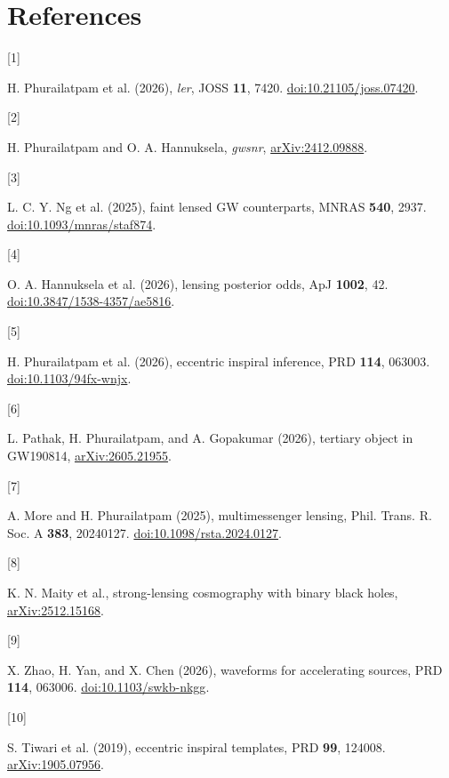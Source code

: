 \documentclass[11pt]{article}
\begin{document}
\section*{References}
\begingroup
\setlength{\parskip}{0pt}
\small
\hypertarget{ref1}{[1]} H. Phurailatpam et al. (2026), \textit{ler}, JOSS \textbf{11}, 7420. \href{https://doi.org/10.21105/joss.07420}{doi:10.21105/joss.07420}.\par
\hypertarget{ref2}{[2]} H. Phurailatpam and O. A. Hannuksela, \textit{gwsnr}, \href{https://arxiv.org/abs/2412.09888}{arXiv:2412.09888}.\par
\hypertarget{ref3}{[3]} L. C. Y. Ng et al. (2025), faint lensed GW counterparts, MNRAS \textbf{540}, 2937. \href{https://doi.org/10.1093/mnras/staf874}{doi:10.1093/mnras/staf874}.\par
\hypertarget{ref4}{[4]} O. A. Hannuksela et al. (2026), lensing posterior odds, ApJ \textbf{1002}, 42. \href{https://doi.org/10.3847/1538-4357/ae5816}{doi:10.3847/1538-4357/ae5816}.\par
\hypertarget{ref5}{[5]} H. Phurailatpam et al. (2026), eccentric inspiral inference, PRD \textbf{114}, 063003. \href{https://doi.org/10.1103/94fx-wnjx}{doi:10.1103/94fx-wnjx}.\par
\hypertarget{ref6}{[6]} L. Pathak, H. Phurailatpam, and A. Gopakumar (2026), tertiary object in GW190814, \href{https://arxiv.org/abs/2605.21955}{arXiv:2605.21955}.\par
\hypertarget{ref7}{[7]} A. More and H. Phurailatpam (2025), multimessenger lensing, Phil. Trans. R. Soc. A \textbf{383}, 20240127. \href{https://doi.org/10.1098/rsta.2024.0127}{doi:10.1098/rsta.2024.0127}.\par
\hypertarget{ref8}{[8]} K. N. Maity et al., strong-lensing cosmography with binary black holes, \href{https://arxiv.org/abs/2512.15168}{arXiv:2512.15168}.\par
\hypertarget{ref9}{[9]} X. Zhao, H. Yan, and X. Chen (2026), waveforms for accelerating sources, PRD \textbf{114}, 063006. \href{https://doi.org/10.1103/swkb-nkgg}{doi:10.1103/swkb-nkgg}.\par
\hypertarget{ref10}{[10]} S. Tiwari et al. (2019), eccentric inspiral templates, PRD \textbf{99}, 124008. \href{https://arxiv.org/abs/1905.07956}{arXiv:1905.07956}.\par
\endgroup
\end{document}
